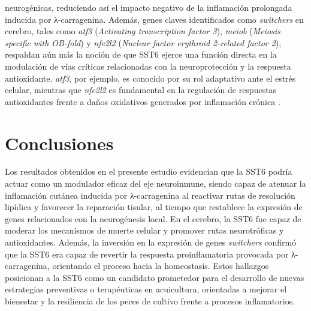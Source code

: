 \documentclass[10pt,a4paper]{article}
\begin{document}
neurogénicas, reduciendo así el impacto negativo de la inflamación prolongada inducida por λ-carragenina. Además, genes claves identificados como \textit{switchers} en cerebro, tales como \textit{atf3} (\textit{Activating transcription factor 3}), \textit{meiob} (\textit{Meiosis specific with OB-fold}) y \textit{nfe2l2} (\textit{Nuclear factor erythroid 2-related factor 2}), respaldan aún más la noción de que SST6 ejerce una función directa en la modulación de vías críticas relacionadas con la neuroprotección y la respuesta antioxidante. \textit{atf3}, por ejemplo, es conocido por su rol adaptativo ante el estrés celular, mientras que \textit{nfe2l2} es fundamental en la regulación de respuestas antioxidantes frente a daños oxidativos generados por inflamación crónica \parencite{Brown2008}.

\section{Conclusiones}
Los resultados obtenidos en el presente estudio evidencian que la SST6 podría actuar como un modulador eficaz del eje neuroinmune, siendo capaz de atenuar la inflamación cutánea inducida por λ-carragenina al reactivar rutas de resolución lipídica y favorecer la reparación tisular, al tiempo que restablece la expresión de genes relacionados con la neurogénesis local. En el cerebro, la SST6 fue capaz de moderar los mecanismos de muerte celular y promover rutas neurotróficas y antioxidantes. Además, la inversión en la expresión de genes \textit{switchers} confirmó que la SST6 era capaz de revertir la respuesta proinflamatoria provocada por λ-carragenina, orientando el proceso hacia la homeostasis. Estos hallazgos posicionan a la SST6 como un candidato prometedor para el desarrollo de nuevas estrategias preventivas o terapéuticas en acuicultura, orientadas a mejorar el bienestar y la resiliencia de los peces de cultivo frente a procesos inflamatorios.

\end{document}
